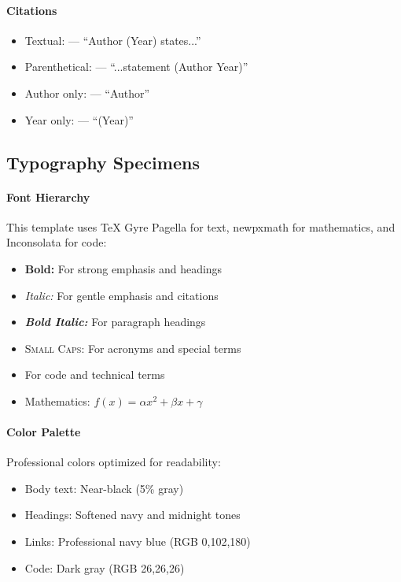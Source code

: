 \documentclass[11pt]{article}
\begin{document}
\paragraph{Citations}
\begin{itemize}
\item Textual:  --- \enquote{Author (Year) states...}
\item Parenthetical:  --- \enquote{...statement (Author Year)}
\item Author only:  --- \enquote{Author}
\item Year only:  --- \enquote{(Year)}
\end{itemize}

\subsection{Typography Specimens}

\paragraph{Font Hierarchy} This template uses TeX Gyre Pagella for text, newpxmath for mathematics, and Inconsolata for code:

\begin{itemize}
\item \textbf{Bold:} For strong emphasis and headings
\item \textit{Italic:} For gentle emphasis and citations
\item \textbf{\textit{Bold Italic:}} For paragraph headings
\item \textsc{Small Caps:} For acronyms and special terms
\item {} For code and technical terms
\item Mathematics: $f(x) = \alpha x^2 + \beta x + \gamma$
\end{itemize}

\paragraph{Color Palette} Professional colors optimized for readability:
\begin{itemize}
\item Body text: Near-black (5\% gray)
\item Headings: Softened navy and midnight tones
\item Links: Professional navy blue (RGB 0,102,180)
\item Code: Dark gray (RGB 26,26,26)
\end{itemize}
\end{document}
